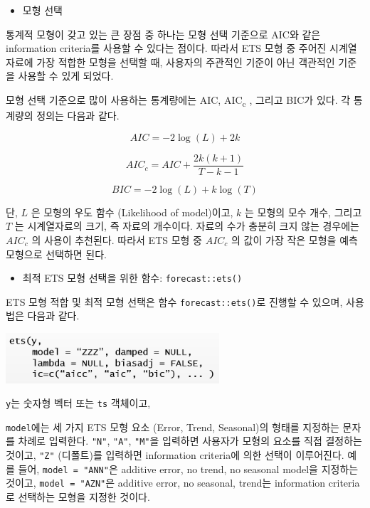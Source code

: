 \documentclass[
]{book}
\providecommand{\tightlist}{%
  \setlength{\itemsep}{0pt}\setlength{\parskip}{0pt}}
\begin{document}
\begin{itemize}
\tightlist
\item
  모형 선택
\end{itemize}

통계적 모형이 갖고 있는 큰 장점 중 하나는 모형 선택 기준으로 AIC와 같은 information criteria를 사용할 수 있다는 점이다. 따라서 ETS 모형 중 주어진 시계열자료에 가장 적합한 모형을 선택할 때, 사용자의 주관적인 기준이 아닌 객관적인 기준을 사용할 수 있게 되었다.

모형 선택 기준으로 많이 사용하는 통계량에는 AIC, AIC\textsubscript{c} , 그리고 BIC가 있다. 각 통계량의 정의는 다음과 같다.

\[AIC = -2\log(L) + 2k\]

\[AIC_{c} = AIC + \frac{2k(k+1)}{T-k-1}\]

\[
BIC = -2\log(L) + k\log(T)
\]

단, \(L\) 은 모형의 우도 함수 (Likelihood of model)이고, \(k\) 는 모형의 모수 개수, 그리고 \(T\) 는 시계열자료의 크기, 즉 자료의 개수이다. 자료의 수가 충분히 크지 않는 경우에는 \(AIC_{c}\) 의 사용이 추천된다. 따라서 ETS 모형 중 \(AIC_{c}\) 의 값이 가장 작은 모형을 예측모형으로 선택하면 된다.

\begin{itemize}
\tightlist
\item
  최적 ETS 모형 선택을 위한 함수: \texttt{forecast::ets()}
\end{itemize}

ETS 모형 적합 및 최적 모형 선택은 함수 \texttt{forecast::ets()}로 진행할 수 있으며, 사용법은 다음과 같다.

\includegraphics[width=3.125in,height=\textheight]{Figures/ets.PNG}

\texttt{y}는 숫자형 벡터 또는 \texttt{ts} 객체이고,

\texttt{model}에는 세 가지 ETS 모형 요소 (Error, Trend, Seasonal)의 형태를 지정하는 문자를 차례로 입력한다. \texttt{"N"}, \texttt{"A"}, \texttt{"M"}을 입력하면 사용자가 모형의 요소를 직접 결정하는 것이고, \texttt{"Z"} (디폴트)를 입력하면 information criteria에 의한 선택이 이루어진다. 예를 들어, \texttt{model\ =\ "ANN"}은 additive error, no trend, no seasonal model을 지정하는 것이고, \texttt{model\ =\ "AZN"}은 additive error, no seasonal, trend는 information criteria로 선택하는 모형을 지정한 것이다.
\end{document}
